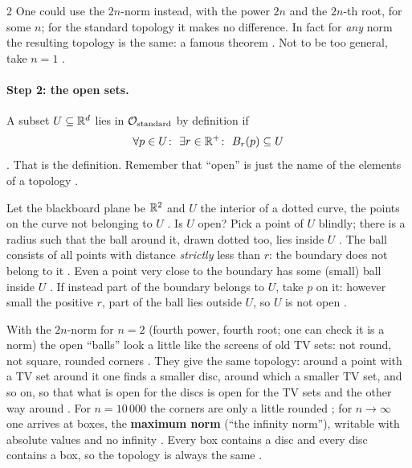 \begin{paracol}{2}
One could use the $2n$-norm instead, with the power $2n$ and the $2n$-th root, for some $n$; for the standard topology it
makes no difference. In fact for \emph{any} norm the resulting topology is the same: a famous theorem
. Not to be too general, take $n=1$ .

\paragraph{Step 2: the open sets.} A subset $U\subseteq\mathbb{R}^d$ lies in $\mathcal O_{\rm standard}$ by definition if
\[
  \forall p\in U\colon\ \exists r\in\mathbb{R}^+\colon\ B_r(p)\subseteq U
\]
. That is the definition. Remember that ``open'' is just the name of the elements
of a topology .

\begin{example}\label{ex:to-picture}
Let the blackboard plane be $\mathbb{R}^2$ and $U$ the interior of a dotted curve, the points on the curve not belonging to $U$
. Is $U$ open? Pick a point of $U$ blindly; there is a radius such that the ball
around it, drawn dotted too, lies inside $U$ . The ball consists of all points with distance
\emph{strictly} less than $r$: the boundary does not belong to it . Even a point very close to the
boundary has some (small) ball inside $U$ . If instead part of the boundary belongs to $U$, take $p$ on
it: however small the positive $r$, part of the ball lies outside $U$, so $U$ is not open .
\end{example}

\begin{intuition}
With the $2n$-norm for $n=2$ (fourth power, fourth root; one can check it is a norm) the open ``balls'' look a little
like the screens of old TV sets: not round, not square, rounded corners . They give the same
topology: around a point with a TV set around it one finds a smaller disc, around which a smaller TV set, and so on, so
that what is open for the discs is open for the TV sets and the other way around . For
$n=10\,000$ the corners are only a little rounded ; for $n\to\infty$ one arrives at
boxes, the \textbf{maximum norm} (``the infinity norm''), writable with absolute values and no infinity
. Every box contains a disc and every disc contains a box, so the topology is always the same
.
\end{intuition}


\end{paracol}
